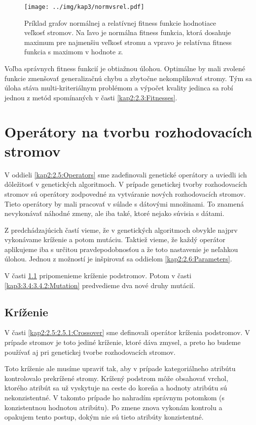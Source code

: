 \begin{figure}[h]
\centering
\centerline{\mbox{\texttt{[image: ../img/kap3/normvsrel.pdf]}}}
\caption{Príklad grafov normálnej a relatívnej fitness funkcie hodnotiace veľkosť stromov. Na ľavo je normálna fitness funkcia, ktorá dosahuje maximum pre najmenšiu veľkosť stromu a vpravo je relatívna fitness funkcia s maximom v hodnote \emph{x}.}\label{fig:normalvsrelative}
\end{figure}

Voľba správnych fitness funkcií je obtiažnou úlohou. Optimálne by mali zvolené funkcie zmenšovať generalizačnú chybu a zbytočne nekomplikovať stromy. Tým sa úloha stáva multi-kriteriálnym problémom a výpočet kvality jedinca sa robí jednou z metód spomínaných v časti \ref{kap2:2.3:Fitnesses}.
\section{Operátory na tvorbu rozhodovacích stromov}\label{kap3:3.4:Operators}
V oddieli \ref{kap2:2.5:Operators} sme zadefinovali genetické operátory a uviedli ich dôležitosť v genetických algoritmoch. V prípade genetickej tvorby rozhodovacích stromov sú operátory zodpovedné za vytváranie nových rozhodovacích stromov. Tieto operátory by mali pracovať v súlade s dátovými množinami. To znamená nevykonávať náhodné zmeny, ale iba také, ktoré nejako súvisia s dátami.

Z predchádzajúcich častí vieme, že v genetických algoritmoch obvykle najprv vykonávame kríženie a potom mutáciu. Taktiež vieme, že každý operátor aplikujeme iba s určitou pravdepodobnosťou a že toto nastavenie je neľahkou úlohou. Jednou z možností je inšpirovať sa oddielom \ref{kap2:2.6:Parameters}.

V časti \ref{kap3:3.4:3.4.1:Crossover} pripomenieme kríženie podstromov. Potom v časti \ref{kap3:3.4:3.4.2:Mutation} predvedieme dva nové druhy mutácií.

\subsection{Kríženie}\label{kap3:3.4:3.4.1:Crossover}
V časti \ref{kap2:2.5:2.5.1:Crossover} sme definovali operátor kríženia podstromov. V prípade stromov je toto jediné kríženie, ktoré dáva zmysel, a preto ho budeme používať aj pri genetickej tvorbe rozhodovacích stromov.

Toto kríženie ale musíme upraviť tak, aby v prípade kategoriálneho atribútu kontrolovalo prekrížené stromy. Krížený podstrom môže obsahovať vrchol, ktorého atribút sa už vyskytuje na ceste do koreňa a hodnoty atribútu sú nekonzistentné. V takomto prípade ho nahradím správnym potomkom (s konzistentnou hodnotou atribútu). Po zmene znova vykonám kontrolu a opakujem tento postup, dokým nie sú tieto atribúty konzistentné.

